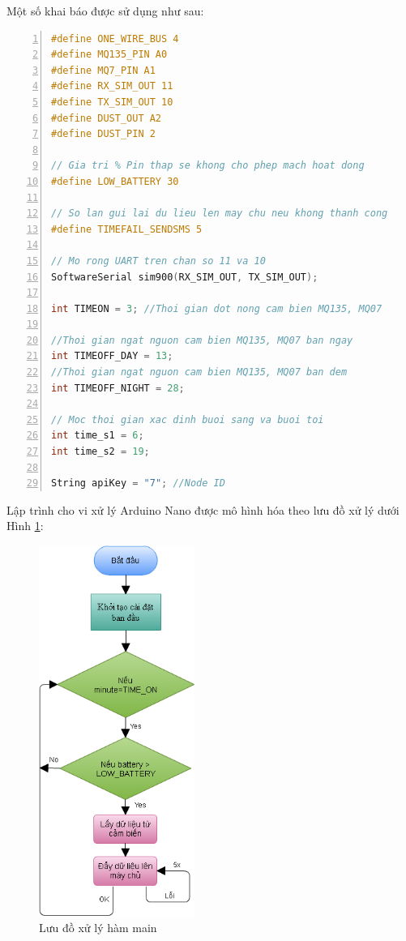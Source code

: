 Một số khai báo được sử dụng như sau:
\begin{lstlisting}[numbers=left,firstnumber=1,language=C]
#define ONE_WIRE_BUS 4
#define MQ135_PIN A0
#define MQ7_PIN A1
#define RX_SIM_OUT 11
#define TX_SIM_OUT 10
#define DUST_OUT A2
#define DUST_PIN 2

// Gia tri % Pin thap se khong cho phep mach hoat dong
#define LOW_BATTERY 30 

// So lan gui lai du lieu len may chu neu khong thanh cong
#define TIMEFAIL_SENDSMS 5 

// Mo rong UART tren chan so 11 va 10
SoftwareSerial sim900(RX_SIM_OUT, TX_SIM_OUT);

int TIMEON = 3; //Thoi gian dot nong cam bien MQ135, MQ07

//Thoi gian ngat nguon cam bien MQ135, MQ07 ban ngay
int TIMEOFF_DAY = 13; 
//Thoi gian ngat nguon cam bien MQ135, MQ07 ban dem
int TIMEOFF_NIGHT = 28;

// Moc thoi gian xac dinh buoi sang va buoi toi
int time_s1 = 6;
int time_s2 = 19;

String apiKey = "7"; //Node ID
\end{lstlisting}
Lập trình cho vi xử lý Arduino Nano được mô hình hóa theo lưu đồ xử lý dưới Hình \ref{fig:node_status}:

\begin{figure}[H]
	\centering    
	\includegraphics[width=2in]{node_status}
	\caption[Lưu đồ xử lý hàm main]{Lưu đồ xử lý hàm main}
	\label{fig:node_status}
\end{figure}

